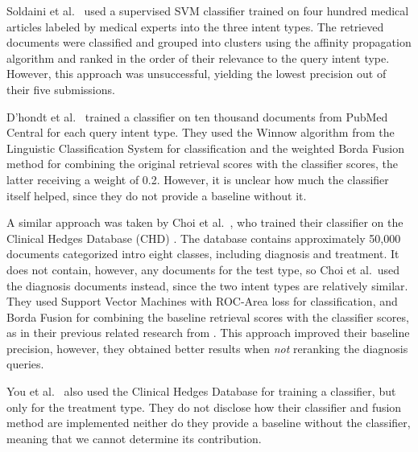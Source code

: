 Soldaini et al.\ \cite{soldani} used a supervised SVM classifier trained on four hundred medical articles
labeled by medical experts into the three intent types. The retrieved documents were classified
and grouped into clusters using the affinity propagation algorithm and ranked in the order of their relevance
to the query intent type. However, this approach was unsuccessful, yielding the lowest precision out of their five submissions.

D’hondt et al.\ \cite{limsi2015} trained a classifier on ten thousand documents from PubMed Central
for each query intent type. They used the Winnow algorithm from the Linguistic Classification System
for classification and the weighted Borda Fusion method for combining the original retrieval scores
with the classifier scores, the latter receiving a weight of 0.2. However, it is
unclear how much the classifier itself helped, since they do not provide a baseline without it.

A similar approach was taken by Choi et al.\ \cite{choi},
who trained their classifier on the Clinical Hedges Database (CHD) \cite{chd}.
The database contains approximately 50,000 documents categorized
intro eight classes, including diagnosis and treatment.
It does not contain, however, any documents for the test type, so Choi et al.\ used the diagnosis documents instead,
since the two intent types are relatively similar.
They used Support Vector Machines with ROC-Area loss for classification,
and Borda Fusion for combining the baseline retrieval
scores with the classifier scores, as in their previous related research from \cite{choi-prev}.
This approach improved their baseline precision, however, they obtained better results when \emph{not} reranking the diagnosis queries.

You et al.\ \cite{FDUMedSearch} also used the Clinical Hedges Database for training a classifier, but only for the treatment type.
They do not disclose how their classifier and fusion method are implemented
neither do they provide a baseline without the classifier, meaning that we cannot determine its contribution.

